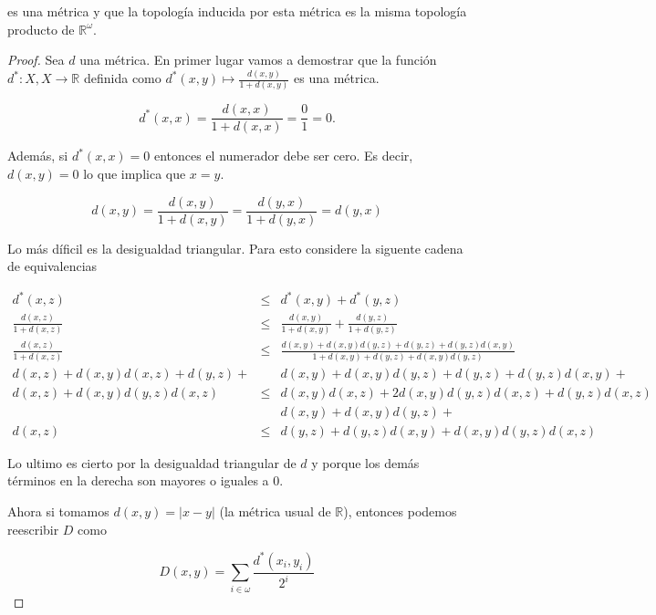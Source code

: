 \documentclass[letter,twoside,12pt]{article}
\begin{document}
\begin{enumerate}
es una métrica y que la topología inducida por esta métrica es la misma topología producto de $ \mathbb{R}^{\omega} $.
\begin{proof}

Sea $ d $ una métrica. En primer lugar vamos a demostrar que la función $ d^*: X,X \to \mathbb{R} $ definida como $ d^*(x,y)\mapsto \frac{d(x,y)}{1+d(x,y)} $ es una métrica.

\begin{equation}
d^*(x,x)= \frac{d(x,x)}{1+d(x,x)}=\frac{0}{1}=0. \nonumber
\end{equation}

Además, si $ d^*(x,x) = 0$ entonces el numerador debe ser cero. Es decir, $ d(x,y)=0 $ lo que implica que $ x = y $.

\begin{equation}
d(x,y)=\frac{d(x,y)}{1+d(x,y)}=\frac{d(y,x)}{1+d(y,x)}=d(y,x) \nonumber
\end{equation}

Lo más díficil es la desigualdad triangular. Para esto considere la siguente cadena de equivalencias

\begin{eqnarray}
d^*(x,z)&\leq&d^*(x,y)+d^*(y,z)\nonumber
\\\frac{d(x,z)}{1+d(x,z)}&\leq&\frac{d(x,y)}{1+d(x,y)}+\frac{d(y,z)}{1+d(y,z)}\nonumber
\\\frac{d(x,z)}{1+d(x,z)}&\leq&\frac{d(x,y)+d(x,y)d(y,z)+d(y,z)+d(y,z)d(x,y)}{1+d(x,y)+d(y,z)+d(x,y)d(y,z)}\nonumber
\\d(x,z)+d(x,y)d(x,z)+d(y,z) +& & d(x,y)+d(x,y)d(y,z)+d(y,z)+d(y,z)d(x,y)+\nonumber
\\d(x,z)+d(x,y)d(y,z)d(x,z)&\leq&d(x,y)d(x,z)+2d(x,y)d(y,z)d(x,z)+d(y,z)d(x,z)\nonumber
\\ & &d(x,y)+d(x,y)d(y,z)+ \nonumber
\\d(x,z)&\leq&d(y,z)+d(y,z)d(x,y)+d(x,y)d(y,z)d(x,z)\nonumber
\end{eqnarray}

Lo ultimo es cierto por la desigualdad triangular de $ d $ y porque los demás términos en la derecha son mayores o iguales a 0. 

Ahora si tomamos $ d(x,y) = |x-y|  $ (la métrica usual de $ \mathbb{R} $), entonces podemos reescribir $ D $ como

\begin{equation}
D(x,y)=\sum_{i \in \omega} \frac{d^*(x_i,y_i)}{2^{i}} \nonumber
\end{equation}


\end{proof}
\end{enumerate}
\end{document}
